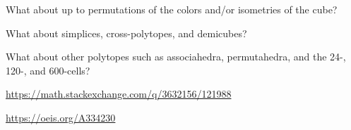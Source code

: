 \documentclass{article}
\begin{document}
\begin{related}
  \item What about up to permutations of the colors and/or isometries of the cube?
  \item What about simplices, cross-polytopes, and demicubes?
  \item What about other polytopes such as associahedra, permutahedra, and
    the 24-, 120-, and 600-cells?
\end{related}

\begin{references}
  \item \url{https://math.stackexchange.com/q/3632156/121988}
  \item \url{https://oeis.org/A334230}
\end{references}
\end{document}
